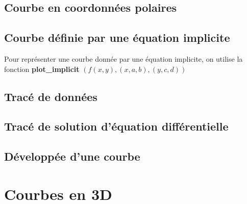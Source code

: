  \subsection{Courbe en coordonnées polaires}
 \subsection{Courbe définie par une équation implicite}
 Pour représenter une courbe donnée par une équation implicite, on utilise la fonction \textbf{plot\_implicit}
 $(f(x, y), (x, a, b), (y, c, d))$
 \subsection{Tracé de données}
 \subsection{Tracé de solution d'équation différentielle}
 
 \subsection{Développée d'une courbe}
 \section{Courbes en 3D}   
